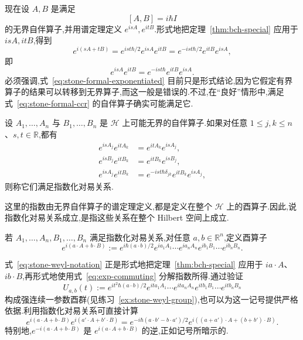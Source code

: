 现在设 $A,B$ 是满足
\[
[A,B]=i\hbar I
\label{eq:stone-formal-ccr}
\]
的无界自伴算子,并用谱定理定义 $e^{isA},e^{itB}$.形式地把定理~\ref{thm:bch-special} 应用于 $isA,itB$,得到
\[
e^{i(sA+tB)}=e^{ist\hbar/2}e^{isA}e^{itB}
=e^{-ist\hbar/2}e^{itB}e^{isA},
\]
即
\[
e^{isA}e^{itB}=e^{-ist\hbar}e^{itB}e^{isA}.
\label{eq:stone-formal-exponentiated}
\]
必须强调,式~\eqref{eq:stone-formal-exponentiated} 目前只是形式结论,因为它假定有界算子的结果可以转移到无界算子,而这一般是错误的.不过,在“良好”情形中,满足式~\eqref{eq:stone-formal-ccr} 的自伴算子确实可能满足它.

\begin{definition}[指数化对易关系]\label{def:exponentiated-commutation}
设 $A_1,\ldots,A_n$ 与 $B_1,\ldots,B_n$ 是 $\mathcal H$ 上可能无界的自伴算子.如果对任意 $1\leq j,k\leq n$、$s,t\in\mathbb R$,都有
\begin{align*}
e^{isA_j}e^{itA_k}&=e^{itA_k}e^{isA_j},\\
e^{isB_j}e^{itB_k}&=e^{itB_k}e^{isB_j},\\
e^{isA_j}e^{itB_k}&=e^{-ist\hbar\delta_{jk}}e^{itB_k}e^{isA_j},
\end{align*}
则称它们满足指数化对易关系.
\end{definition}

这里的指数由无界自伴算子的谱定理定义,都是定义在整个 $\mathcal H$ 上的酉算子.因此,说指数化对易关系成立,是指这些关系在整个 Hilbert 空间上成立.

\begin{definition}\label{def:weyl-operator-notation}
若 $A_1,\ldots,A_n,B_1,\ldots,B_n$ 满足指数化对易关系,对任意 $a,b\in\mathbb R^n$,定义酉算子
\[
e^{i(a\cdot A+b\cdot B)}
:=e^{i\hbar(a\cdot b)/2}e^{ia_1A_1}\cdots e^{ia_nA_n}
e^{ib_1B_1}\cdots e^{ib_nB_n}.
\label{eq:stone-weyl-notation}
\]
\end{definition}

式~\eqref{eq:stone-weyl-notation} 正是形式地把定理~\ref{thm:bch-special} 应用于 $ia\cdot A$、$ib\cdot B$,再形式地使用式~\eqref{eq:exp-commuting} 分解指数所得.通过验证
\[
U_{a,b}(t):=e^{it^2\hbar(a\cdot b)/2}e^{ita_1A_1}\cdots e^{ita_nA_n}
e^{itb_1B_1}\cdots e^{itb_nB_n}
\label{eq:stone-one-parameter}
\]
构成强连续一参数酉群(见练习~\ref{ex:stone-weyl-group}),也可以为这一记号提供严格依据.利用指数化对易关系可直接计算
\[
e^{i(a\cdot A+b\cdot B)}e^{i(a'\cdot A+b'\cdot B)}
=e^{-i\hbar(a\cdot b'-b\cdot a')/2}
e^{i((a+a')\cdot A+(b+b')\cdot B)}.
\label{eq:stone-weyl-product}
\]
特别地,$e^{-i(a\cdot A+b\cdot B)}$ 是 $e^{i(a\cdot A+b\cdot B)}$ 的逆,正如记号所暗示的.

